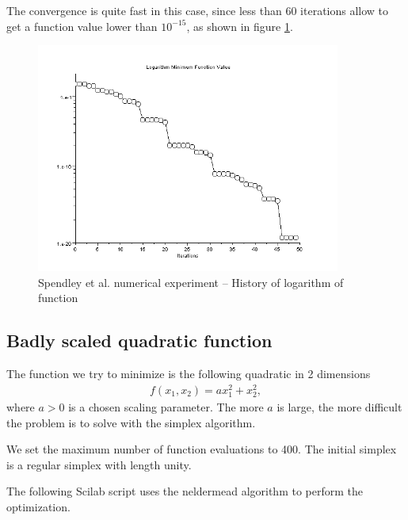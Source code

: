 The convergence is quite fast in this case, since less than 60 iterations
allow to get a function value lower than $10^{-15}$, as shown in 
figure \ref{fig-spendley-numexp1-logfopt}.

\begin{figure}
\begin{center}
\includegraphics[width=10cm]{quad2bis-spendley-history-logfopt.png}
\end{center}
\caption{Spendley et al. numerical experiment -- History of logarithm of function}
\label{fig-spendley-numexp1-logfopt}
\end{figure}

\subsection{Badly scaled quadratic function}

The function we try to minimize is the following quadratic 
in 2 dimensions 
\begin{eqnarray}
\label{quadratic-sp-function2}
f(x_1,x_2) = a x_1^2 + x_2^2,
\end{eqnarray}
where $a>0$ is a chosen scaling parameter. 
The more $a$ is large, the more difficult the problem is 
to solve with the simplex algorithm.

We set the maximum number of function evaluations to 400.
The initial simplex is a regular simplex with length unity.

The following Scilab script uses the neldermead algorithm to perform the 
optimization.

